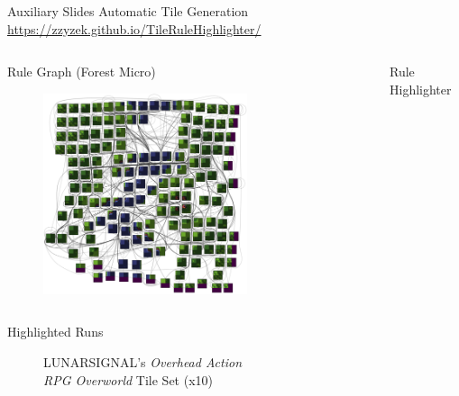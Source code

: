 \documentclass{beamer}
\begin{document}
  \begin{frame}[fragile]{Auxiliary Slides}
    Automatic Tile Generation \\
    \url{https://zzyzek.github.io/TileRuleHighlighter/}
    \begin{columns}[T,onlytextwidth]
        \begin{block}{Rule Graph (Forest Micro)}
          \begin{figure}
            \includegraphics[width=0.7\textwidth]{img/forestmicro_rule_grid_tb.pdf}
          \end{figure}
        \end{block}
        \begin{block}{Rule Highlighter}
          \begin{figure}
          \end{figure}
        \end{block}
    \end{columns}

  \end{frame}


  \begin{frame}[fragile]{Highlighted Runs}
    \begin{figure}
      LUNARSIGNAL's \textit{Overhead Action} \\ \textit{RPG Overworld} Tile Set (x10)
    \end{figure}
  \end{frame}
\end{document}
